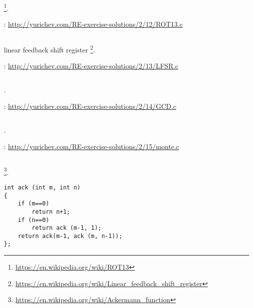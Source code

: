 \footnote{\url{https://en.wikipedia.org/wiki/ROT13}}.

\Sourcecode: \url{http://yurichev.com/RE-exercise-solutions/2/12/ROT13.c}

\subsection{}

linear feedback shift register
\footnote{\url{https://en.wikipedia.org/wiki/Linear_feedback_shift_register}}.

\Sourcecode: \url{http://yurichev.com/RE-exercise-solutions/2/13/LFSR.c}

\subsection{}

.

\Sourcecode: \url{http://yurichev.com/RE-exercise-solutions/2/14/GCD.c}

\subsection{}

.

\Sourcecode: \url{http://yurichev.com/RE-exercise-solutions/2/15/monte.c}

\subsection{}

\footnote{\url{https://en.wikipedia.org/wiki/Ackermann_function}}.

\begin{lstlisting}
int ack (int m, int n)
{
	if (m==0)
		return n+1;
	if (n==0)
		return ack (m-1, 1);
	return ack(m-1, ack (m, n-1));
};
\end{lstlisting}

